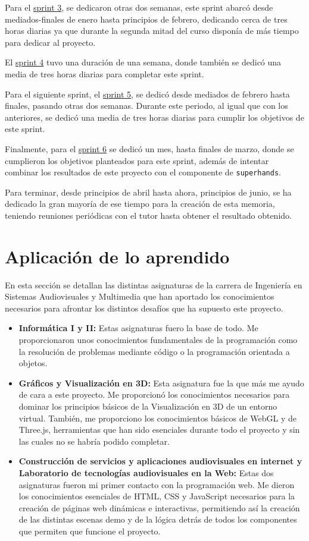 \documentclass[a4paper, 12pt]{book}
\begin{document}
Para el \hyperref[sec:sprint3]{sprint 3}, se dedicaron otras dos semanas, este sprint abarcó desde mediados-finales de enero hasta principios de febrero, dedicando cerca de tres horas diarias ya que durante la segunda mitad del curso disponía de más tiempo para dedicar al proyecto.

El \hyperref[sec:sprint4]{sprint 4} tuvo una duración de una semana, donde también se dedicó una media de tres horas diarias para completar este sprint.

Para el siguiente sprint, el \hyperref[sec:sprint5]{sprint 5}, se dedicó desde mediados de febrero hasta finales, pasando otras dos semanas. Durante este periodo, al igual que con los anteriores, se dedicó una media de tres horas diarias para cumplir los objetivos de este sprint. 

Finalmente, para el \hyperref[sec:sprint6]{sprint 6} se dedicó un mes, hasta finales de marzo, donde se cumplieron los objetivos planteados para este sprint, además de intentar combinar los resultados de este proyecto con el componente de \texttt{superhands}.

Para terminar, desde principios de abril hasta ahora, principios de junio, se ha dedicado la gran mayoría de ese tiempo para la creación de esta memoria, teniendo reuniones periódicas con el tutor hasta obtener el resultado obtenido. 

\section{Aplicación de lo aprendido}
\label{sec:aplicacion}

En esta sección se detallan las distintas asignaturas de la carrera de Ingeniería en Sistemas Audiovisuales y Multimedia que han aportado los conocimientos necesarios para afrontar los distintos desafíos que ha supuesto este proyecto. 

\begin{itemize}
  \item \textbf{Informática I y II:} Estas asignaturas fuero la base de todo. Me proporcionaron unos conocimientos fundamentales de la programación como la resolución de problemas mediante código o la programación orientada a objetos.
  \item \textbf{Gráficos y Visualización en 3D:} Esta asignatura fue la que más me ayudo de cara a este proyecto. Me proporcionó los conocimientos necesarios para dominar los principios básicos de la Visualización en 3D de un entorno virtual. También, me proporciono los conocimientos básicos de WebGL y de Three.js, herramientas que han sido esenciales durante todo el proyecto y sin las cuales no se habría podido completar. 
  \item \textbf{Construcción de servicios y aplicaciones audiovisuales en internet y Laboratorio de tecnologías audiovisuales en la Web:} Estas dos asignaturas fueron mi primer contacto con la programación web. Me dieron los conocimientos esenciales de HTML, CSS y JavaScript necesarios para la creación de páginas web dinámicas e interactivas, permitiendo así la creación de las distintas escenas demo y de la lógica detrás de todos los componentes que permiten que funcione el proyecto.
\end{itemize}
\end{document}
